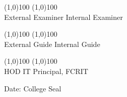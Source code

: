 \documentclass[oneside,12pt]{Classes/CUEDthesisPSnPDF}
\theoremstyle{definition}
\begin{document}
\begin{titlepage}
\begin{center}
\hspace{0.2in} \line(1,0){100}
\hspace{1.9in}
            \line(1,0){100} \\
\hspace{0.2in}
External Examiner   \hspace{1.9in} Internal Examiner \\
\vspace*{1\baselineskip}
\end{center}
\begin{center}
\hspace{0.2in} \line(1,0){100}
\hspace{1.9in}
            \line(1,0){100} \\
\hspace{0.2in}
External Guide   \hspace{2.2in} Internal Guide \\
\vspace*{1\baselineskip}
\end{center}
\begin{center}
\hspace{0.2in} \line(1,0){100}
\hspace{1.9in}
            \line(1,0){100} \\
\hspace{0.3in}
HOD IT  \hspace{2.5in} Principal, FCRIT \\
\vspace*{1\baselineskip}
\end{center}


\hspace{0.1in}Date:   \hspace{3.5in} College Seal
\end{titlepage}

\setcounter{page}{1}


\newpage
\end{document}
